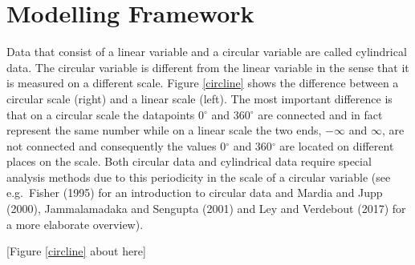 \documentclass[man,mask]{apa6}
\begin{document}
\section{Modelling Framework}

Data that consist of a linear variable and a circular variable are called
cylindrical data. The circular variable is different from the linear variable in
the sense that it is measured on a different scale. Figure \ref{circline} shows
the difference between a circular scale (right) and a linear scale (left). The
most important difference is that on a circular scale the datapoints 0\(^\circ\)
and 360\(^\circ\) are connected and in fact represent the same number while on a
linear scale the two ends, \(-\infty\) and \(\infty\), are not connected and
consequently the values 0\(^\circ\) and 360\(^\circ\) are located on different
places on the scale. Both circular data and cylindrical data require special
analysis methods due to this periodicity in the scale of a circular variable
(see e.g.~Fisher (1995) for an introduction to circular data and
Mardia and Jupp (2000), Jammalamadaka and Sengupta (2001) and Ley and Verdebout (2017) for a more
elaborate overview).

\hfil [Figure \ref{circline} about here] \hfil
\end{document}
